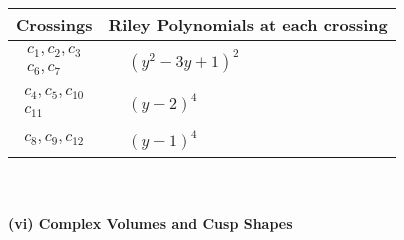 \documentclass[1p]{elsarticle_modified}
\theoremstyle{definition}
\begin{document}
\begin{tabular}{m{50pt}|m{274pt}}
Crossings & \hspace{64pt}Riley Polynomials at each crossing \\
\hline $$\begin{aligned}c_{1},c_{2},c_{3}\\c_{6},c_{7}\end{aligned}$$&$\begin{aligned}
&(y^2-3 y+1)^2
\end{aligned}$\\
\hline $$\begin{aligned}c_{4},c_{5},c_{10}\\c_{11}\end{aligned}$$&$\begin{aligned}
&(y-2)^4
\end{aligned}$\\
\hline $$\begin{aligned}c_{8},c_{9},c_{12}\end{aligned}$$&$\begin{aligned}
&(y-1)^4
\end{aligned}$\\
\hline
\end{tabular}\\~\\
\newpage\flushleft \textbf{(vi) Complex Volumes and Cusp Shapes}
\end{document}
